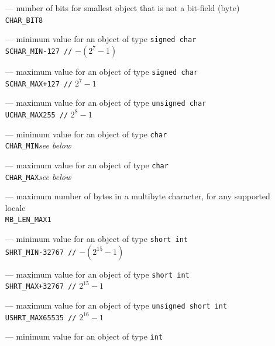 \begin{itemize}
\item[---] number of bits for smallest object that is not a bit-field (byte)\\
\texttt{CHAR\_BIT}\hfil\hspace*{2cm}\texttt{8}
\item[---] minimum value for an object of type \texttt{signed char}\\
\texttt{SCHAR\_MIN}\hfil\hspace*{2cm}\texttt{-127 //} $-(2^7 - 1)$
\item[---] maximum value for an object of type \texttt{signed char}\\
\texttt{SCHAR\_MAX}\hfil\hspace*{2cm}\texttt{+127 //} $2^7 - 1$
\item[---] maximum value for an object of type \texttt{unsigned char}\\
\texttt{UCHAR\_MAX}\hfil\hspace*{2cm}\texttt{255 //} $2^8 - 1$
\item[---] minimum value for an object of type \texttt{char}\\
\texttt{CHAR\_MIN}\hfil\hspace*{2cm}\textit{see below}
\item[---] maximum value for an object of type \texttt{char}\\
\texttt{CHAR\_MAX}\hfil\hspace*{2cm}\textit{see below}
\item[---] maximum number of bytes in a multibyte character, for any supported
  locale\\
\texttt{MB\_LEN\_MAX}\hfil\hspace*{2cm}\texttt{1}
\item[---] minimum value for an object of type \texttt{short int}\\
\texttt{SHRT\_MIN}\hfil\hspace*{2cm}\texttt{-32767 //} $-(2^{15} - 1)$
\item[---] maximum value for an object of type \texttt{short int}\\
\texttt{SHRT\_MAX}\hfil\hspace*{2cm}\texttt{+32767 //} $2^{15} - 1$
\item[---] maximum value for an object of type \texttt{unsigned short int}\\
\texttt{USHRT\_MAX}\hfil\hspace*{2cm}\texttt{65535 //} $2^{16} - 1$
\item[---] minimum value for an object of type \texttt{int}\\

\end{itemize}
